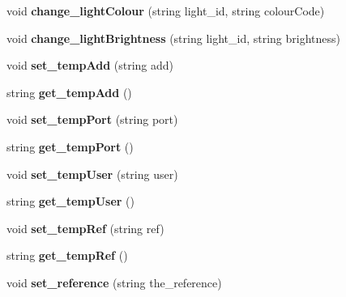 \begin{DoxyCompactItemize}
\item 
\mbox{\label{class_bridge_a9c084f919c36bf11272c3177978f59f0}} 
void {\bfseries change\+\_\+light\+Colour} (string light\+\_\+id, string colour\+Code)
\item 
\mbox{\label{class_bridge_a60889f70bfd4cc4f0b63859f2656ca21}} 
void {\bfseries change\+\_\+light\+Brightness} (string light\+\_\+id, string brightness)
\item 
\mbox{\label{class_bridge_a30fa03f30ee52a0eb8661b79763b32c5}} 
void {\bfseries set\+\_\+temp\+Add} (string add)
\item 
\mbox{\label{class_bridge_ac38732876e444d204e0bf47b36169749}} 
string {\bfseries get\+\_\+temp\+Add} ()
\item 
\mbox{\label{class_bridge_a57fdc9c4f565cdb468b0d8db9ac5ac84}} 
void {\bfseries set\+\_\+temp\+Port} (string port)
\item 
\mbox{\label{class_bridge_ae192e205a6e6c50f23b46865cc643668}} 
string {\bfseries get\+\_\+temp\+Port} ()
\item 
\mbox{\label{class_bridge_afd4d7c78bb467dc96cf1d4888b972bfa}} 
void {\bfseries set\+\_\+temp\+User} (string user)
\item 
\mbox{\label{class_bridge_ae4fdb6ba396078ec6276e397ad6a05ba}} 
string {\bfseries get\+\_\+temp\+User} ()
\item 
\mbox{\label{class_bridge_a0d8a78cf0597dcdfb346595641704a3d}} 
void {\bfseries set\+\_\+temp\+Ref} (string ref)
\item 
\mbox{\label{class_bridge_a2bcd54d0d6e8cd86afdec7391233b117}} 
string {\bfseries get\+\_\+temp\+Ref} ()
\item 
\mbox{\label{class_bridge_a835d13dc3ba620bef30e92a7dbb0baa4}} 
void {\bfseries set\+\_\+reference} (string the\+\_\+reference)
\item 
\mbox{\label{class_bridge_a25786b8fc161a3b05199269ce89162a9}} 

\end{DoxyCompactItemize}
